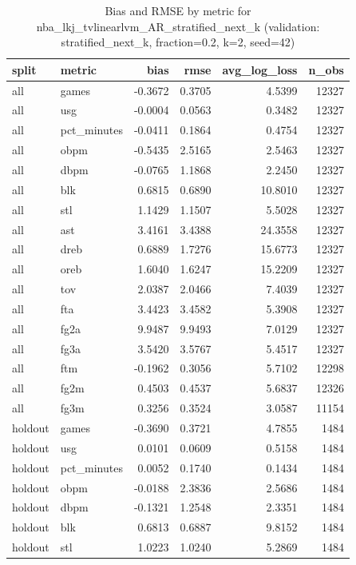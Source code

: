 \begin{table}
\caption{Bias and RMSE by metric for nba_lkj_tvlinearlvm_AR_stratified_next_k (validation: stratified_next_k, fraction=0.2, k=2, seed=42)}
\label{tab:nba_lkj_tvlinearlvm_AR_stratified_next_k_vs_stratified_next_k_f20_k2_s42_bias_rmse}
\begin{tabular}{llrrrr}
\toprule
split & metric & bias & rmse & avg\_log\_loss & n\_obs \\
\midrule
all & games & -0.3672 & 0.3705 & 4.5399 & 12327 \\
all & usg & -0.0004 & 0.0563 & 0.3482 & 12327 \\
all & pct\_minutes & -0.0411 & 0.1864 & 0.4754 & 12327 \\
all & obpm & -0.5435 & 2.5165 & 2.5463 & 12327 \\
all & dbpm & -0.0765 & 1.1868 & 2.2450 & 12327 \\
all & blk & 0.6815 & 0.6890 & 10.8010 & 12327 \\
all & stl & 1.1429 & 1.1507 & 5.5028 & 12327 \\
all & ast & 3.4161 & 3.4388 & 24.3558 & 12327 \\
all & dreb & 0.6889 & 1.7276 & 15.6773 & 12327 \\
all & oreb & 1.6040 & 1.6247 & 15.2209 & 12327 \\
all & tov & 2.0387 & 2.0466 & 7.4039 & 12327 \\
all & fta & 3.4423 & 3.4582 & 5.3908 & 12327 \\
all & fg2a & 9.9487 & 9.9493 & 7.0129 & 12327 \\
all & fg3a & 3.5420 & 3.5767 & 5.4517 & 12327 \\
all & ftm & -0.1962 & 0.3056 & 5.7102 & 12298 \\
all & fg2m & 0.4503 & 0.4537 & 5.6837 & 12326 \\
all & fg3m & 0.3256 & 0.3524 & 3.0587 & 11154 \\
holdout & games & -0.3690 & 0.3721 & 4.7855 & 1484 \\
holdout & usg & 0.0101 & 0.0609 & 0.5158 & 1484 \\
holdout & pct\_minutes & 0.0052 & 0.1740 & 0.1434 & 1484 \\
holdout & obpm & -0.0188 & 2.3836 & 2.5686 & 1484 \\
holdout & dbpm & -0.1321 & 1.2548 & 2.3351 & 1484 \\
holdout & blk & 0.6813 & 0.6887 & 9.8152 & 1484 \\
holdout & stl & 1.0223 & 1.0240 & 5.2869 & 1484 \\

\end{tabular}
\end{table}
